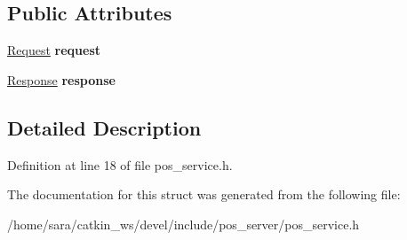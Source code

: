 \subsection*{Public Attributes}
\begin{DoxyCompactItemize}
\item 
\mbox{\label{structpos__server_1_1pos__service_abbaecc5451605dfb14aca6647a521325}} 
\hyperlink{structpos__server_1_1pos__serviceRequest__}{Request} {\bfseries request}
\item 
\mbox{\label{structpos__server_1_1pos__service_ac397494d5d4895aa14f6b2122c9a9e06}} 
\hyperlink{structpos__server_1_1pos__serviceResponse__}{Response} {\bfseries response}
\end{DoxyCompactItemize}


\subsection{Detailed Description}


Definition at line 18 of file pos\+\_\+service.\+h.



The documentation for this struct was generated from the following file\+:\begin{DoxyCompactItemize}
\item 
/home/sara/catkin\+\_\+ws/devel/include/pos\+\_\+server/pos\+\_\+service.\+h\end{DoxyCompactItemize}
